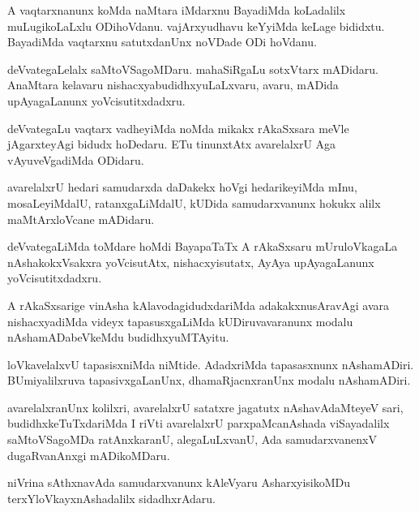 \documentclass{article}
\begin{document}
\begin{mn}
A  vaqtarxnanunx  koMda naMtara  iMdarxnu  BayadiMda  koLadalilx  muLugikoLaLxlu  ODihoVdanu.  
vajArxyudhavu  keYyiMda  keLage  bididxtu.  BayadiMda  vaqtarxnu  satutxdanUnx  noVDade  ODi hoVdanu.
\end{mn}

\begin{mn}
deVvategaLelalx  saMtoVSagoMDaru.  mahaSiRgaLu  sotxVtarx mADidaru.  AnaMtara  kelavaru  
nishacxyabudidhxyuLaLxvaru,  avaru,  mADida  upAyagaLanunx  yoVcisutitxdadxru.
\end{mn}

\begin{mn}
deVvategaLu  vaqtarx  vadheyiMda  noMda  mikakx  rAkaSxsara  meVle  jAgarxteyAgi  
bidudx  hoDedaru.  ETu  tinunxtAtx  avarelalxrU  Aga  vAyuveVgadiMda  ODidaru.
\end{mn}

\begin{mn}
avarelalxrU  hedari  samudarxda daDakekx  hoVgi  hedarikeyiMda  mInu,  mosaLeyiMdalU,  
ratanxgaLiMdalU,  kUDida  samudarxvanunx  hokukx  alilx  maMtArxloVcane  mADidaru.
\end{mn}

\begin{mn}
deVvategaLiMda  toMdare  hoMdi  BayapaTaTx  A  rAkaSxsaru  mUruloVkagaLa  nAshakokxVsakxra  
yoVcisutAtx,  nishacxyisutatx,  AyAya  upAyagaLanunx  yoVcisutitxdadxru.
\end{mn}

\begin{mn}
A  rAkaSxsarige  vinAsha  kAlavodagidudxdariMda  adakakxnusAravAgi  avara  nishacxyadiMda  
videyx  tapasusxgaLiMda  kUDiruvavaranunx  modalu  nAshamADabeVkeMdu  budidhxyuMTAyitu.
\end{mn}

\begin{mn}
loVkavelalxvU  tapasisxniMda  niMtide.  AdadxriMda  tapasasxnunx nAshamADiri.  BUmiyalilxruva  
tapasivxgaLanUnx,  dhamaRjacnxranUnx  modalu  nAshamADiri.
\end{mn}

\begin{mn}
avarelalxranUnx  kolilxri,  avarelalxrU  satatxre  jagatutx  nAshavAdaMteyeV  sari,  
budidhxkeTuTxdariMda  I riVti  avarelalxrU  parxpaMcanAshada  viSayadalilx  saMtoVSagoMDa  
ratAnxkaranU,  alegaLuLxvanU,  Ada  samudarxvanenxV  dugaRvanAnxgi  mADikoMDaru.
\end{mn}

\begin{mn}
niVrina  sAthxnavAda  samudarxvanunx  kAleVyaru  AsharxyisikoMDu  terxYloVkayxnAshadalilx  sidadhxrAdaru.
\end{mn}
\end{document}
